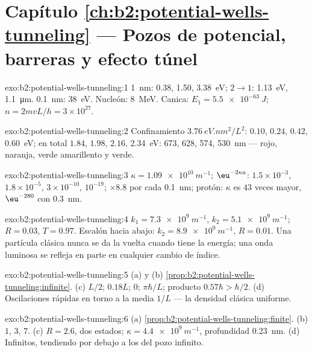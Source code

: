 \section*{Capítulo \ref{ch:b2:potential-wells-tunneling} --- Pozos de potencial, barreras y efecto túnel}

\begin{solution}{exo:b2:potential-wells-tunneling:1}
\qty{1}{nm}: \qty{0.38}{}, \qty{1.50}{}, \qty{3.38}{eV}; $2 \to 1$: \qty{1.13}{eV}, \qty{1.1}{\micro m}.
\qty{0.1}{nm}: \qty{38}{eV}. Nucleón: \qty{8}{MeV}. Canica: $E_1 = \qty{5.5e-63}{J}$;
$n = 2mvL/h = 3 \times 10^{27}$.
\end{solution}

\begin{solution}{exo:b2:potential-wells-tunneling:2}
Confinamiento $\qty{3.76}{eV.nm^2}/L^2$: $0.10$, $0.24$, $0.42$, \qty{0.60}{eV}; en total
$1.84$, $1.98$, $2.16$, \qty{2.34}{eV}: \qty{673}{}, \qty{628}{}, \qty{574}{}, \qty{530}{nm} ---
rojo, naranja, verde amarillento y verde.
\end{solution}

\begin{solution}{exo:b2:potential-wells-tunneling:3}
$\kappa = \qty{1.09e10}{m^{-1}}$; $\eu^{-2\kappa a}$: $1.5 \times 10^{-3}$, $1.8 \times 10^{-5}$,
$3 \times 10^{-10}$, $10^{-19}$; $\times 8.8$ por cada \qty{0.1}{nm}; protón: $\kappa$ es
$43$ veces mayor, $\eu^{-280}$ con \qty{0.3}{nm}.
\end{solution}

\begin{solution}{exo:b2:potential-wells-tunneling:4}
$k_1 = \qty{7.3e9}{m^{-1}}$, $k_2 = \qty{5.1e9}{m^{-1}}$; $R = 0.03$, $T = 0.97$. Escalón
hacia abajo: $k_2 = \qty{8.9e9}{m^{-1}}$, $R = 0.01$. Una partícula clásica nunca
se da la vuelta cuando tiene la energía; una onda luminosa se refleja en parte
en cualquier cambio de índice.
\end{solution}

\begin{solution}{exo:b2:potential-wells-tunneling:5}
(a) y (b) \cref{prop:b2:potential-wells-tunneling:infinite}. (c) $L/2$;
$0.18L$; $0$; $\pi\hbar/L$; producto $0.57\hbar > \hbar/2$. (d) Oscilaciones
rápidas en torno a la media $1/L$ --- la densidad clásica uniforme.
\end{solution}

\begin{solution}{exo:b2:potential-wells-tunneling:6}
(a) \cref{prop:b2:potential-wells-tunneling:finite}. (b) $1$, $3$, $7$.
(c) $R = 2.6$, dos estados; $\kappa = \qty{4.4e9}{m^{-1}}$, profundidad \qty{0.23}{nm}. (d)
Infinitos, tendiendo por debajo a los del pozo infinito.
\end{solution}

